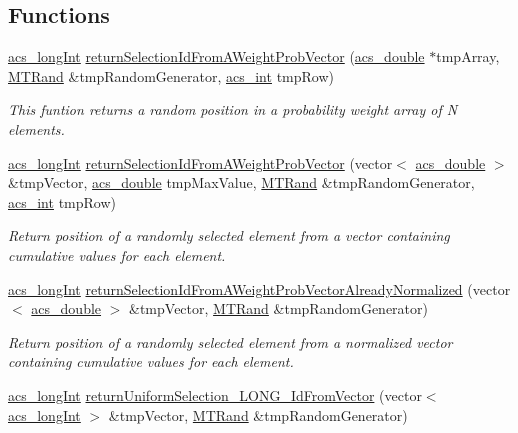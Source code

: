 \subsection*{Functions}
\begin{DoxyCompactItemize}
\item 
\hyperlink{a00024_a19319d75f02db4308bc5c0026d98cd85}{acs\-\_\-long\-Int} \hyperlink{a00027_aa6403f90846f5fb19fcfb8b81aeee73c}{return\-Selection\-Id\-From\-A\-Weight\-Prob\-Vector} (\hyperlink{a00024_ab776853a005fcbf56af0424a2a4dd607}{acs\-\_\-double} $\ast$tmp\-Array, \hyperlink{a00016}{M\-T\-Rand} \&tmp\-Random\-Generator, \hyperlink{a00024_a8d277355641a098190360234e2ebde35}{acs\-\_\-int} tmp\-Row)
\begin{DoxyCompactList}\small\item\em This funtion returns a random position in a probability weight array of N elements. \end{DoxyCompactList}\item 
\hyperlink{a00024_a19319d75f02db4308bc5c0026d98cd85}{acs\-\_\-long\-Int} \hyperlink{a00027_a308bfda14afb58f5ffa8b872c8bcc64e}{return\-Selection\-Id\-From\-A\-Weight\-Prob\-Vector} (vector$<$ \hyperlink{a00024_ab776853a005fcbf56af0424a2a4dd607}{acs\-\_\-double} $>$ \&tmp\-Vector, \hyperlink{a00024_ab776853a005fcbf56af0424a2a4dd607}{acs\-\_\-double} tmp\-Max\-Value, \hyperlink{a00016}{M\-T\-Rand} \&tmp\-Random\-Generator, \hyperlink{a00024_a8d277355641a098190360234e2ebde35}{acs\-\_\-int} tmp\-Row)
\begin{DoxyCompactList}\small\item\em Return position of a randomly selected element from a vector containing cumulative values for each element. \end{DoxyCompactList}\item 
\hyperlink{a00024_a19319d75f02db4308bc5c0026d98cd85}{acs\-\_\-long\-Int} \hyperlink{a00027_a4135ff15fd24eb8fbfee3d00e1cfbf20}{return\-Selection\-Id\-From\-A\-Weight\-Prob\-Vector\-Already\-Normalized} (vector$<$ \hyperlink{a00024_ab776853a005fcbf56af0424a2a4dd607}{acs\-\_\-double} $>$ \&tmp\-Vector, \hyperlink{a00016}{M\-T\-Rand} \&tmp\-Random\-Generator)
\begin{DoxyCompactList}\small\item\em Return position of a randomly selected element from a normalized vector containing cumulative values for each element. \end{DoxyCompactList}\item 
\hyperlink{a00024_a19319d75f02db4308bc5c0026d98cd85}{acs\-\_\-long\-Int} \hyperlink{a00027_a1cb9cc6ac8ec2ef62b8eb1970e73a11b}{return\-Uniform\-Selection\-\_\-\-L\-O\-N\-G\-\_\-\-Id\-From\-Vector} (vector$<$ \hyperlink{a00024_a19319d75f02db4308bc5c0026d98cd85}{acs\-\_\-long\-Int} $>$ \&tmp\-Vector, \hyperlink{a00016}{M\-T\-Rand} \&tmp\-Random\-Generator)

\end{DoxyCompactItemize}
